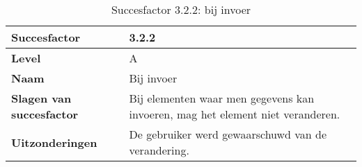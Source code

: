 \begin{table}[H]
    \centering
    \caption{Succesfactor 3.2.2: bij invoer}
    
    
    \hspace*{-1cm}\begin{tabular}{|l|p{12cm}|} 
        \hline
        \textbf{Succesfactor}                 & 3.2.2                                                                                                                                                                                                                                                                                                                                                                                                                                                                                                        \\ 
        \hline
        \textbf{Level}                        & A                                                                                                                                                                                                                                                                                                                                                                                                                                                                                                               \\ 
        \hline
        \textbf{Naam}                         & Bij invoer~                                                                                                                                                                                                                                                                                                                                                                                                                                                                                      \\ 
        \hline
        \textbf{Slagen van succesfactor}      & Bij elementen waar men gegevens kan invoeren, mag het element niet veranderen.
        \\  
        \hline
        \textbf{Uitzonderingen}     & 
   De gebruiker werd gewaarschuwd van de verandering.                                                                                                                                                                                           \\ 

\end{tabular}
\end{table}
